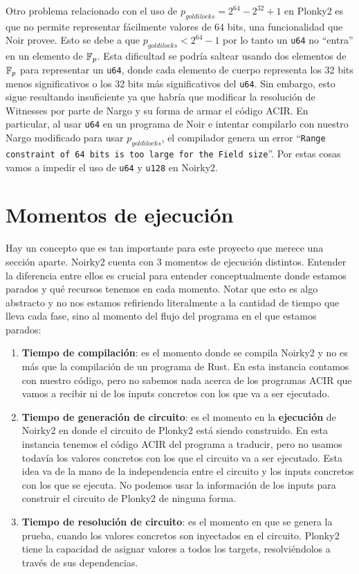 Otro problema relacionado con el uso de $p_{goldilocks} = 2^{64}-2^{32}+1$ en Plonky2 es que no permite representar fácilmente valores de 64 bits, una funcionalidad que Noir provee. Esto se debe a que $p_{goldilocks} < 2^{64}-1$ por lo tanto un \texttt{u64} no “entra'' en un elemento de $\mathbb{F}_p$. Esta dificultad se podría saltear usando dos elementos de $\mathbb{F}_p$ para representar un \texttt{u64}, donde cada elemento de cuerpo representa los 32 bits menos significativos o los 32 bits más significativos del \texttt{u64}. Sin embargo, esto sigue resultando insuficiente ya que habría que modificar la resolución de Witnesses por parte de Nargo y su forma de armar el código ACIR. En particular, al usar \texttt{u64} en un programa de Noir e intentar compilarlo con nuestro Nargo modificado para usar $p_{goldilocks}$, el compilador genera un error “\texttt{Range constraint of 64 bits is too large for the Field size}''. Por estas cosas vamos a impedir el uso de \texttt{u64} y \texttt{u128} en Noirky2. 



\section{Momentos de ejecución}\label{sec:tiempos_de_ejecución}
Hay un concepto que es tan importante para este proyecto que merece una sección aparte. Noirky2 cuenta con 3 momentos de ejecución distintos. Entender la diferencia entre ellos es crucial para entender conceptualmente donde estamos parados y qué recursos tenemos en cada momento. Notar que esto es algo abstracto y no nos estamos refiriendo literalmente a la cantidad de tiempo que lleva cada fase, sino al momento del flujo del programa en el que estamos parados:
\begin{enumerate}
    \item \textbf{Tiempo de compilación}: es el momento donde se compila Noirky2 y no es más que la compilación de un programa de Rust. En esta instancia contamos con nuestro código, pero no sabemos nada acerca de los programas ACIR que vamos a recibir ni de los inputs concretos con los que va a ser ejecutado.
    
    \item \textbf{Tiempo de generación de circuito}: es el momento en la \textbf{ejecución} de Noirky2 en donde el circuito de Plonky2 está siendo construido. En esta instancia tenemos el código ACIR del programa a traducir, pero no usamos todavía los valores concretos con los que el circuito va a ser ejecutado. Esta idea va de la mano de la independencia entre el circuito y los inputs concretos con los que se ejecuta. No podemos usar la información de los inputs para construir el circuito de Plonky2 de ninguna forma.

    \item \textbf{Tiempo de resolución de circuito}: es el momento en que se genera la prueba, cuando los valores concretos son inyectados en el circuito. Plonky2 tiene la capacidad de asignar valores a todos los targets, resolviéndolos a través de sus dependencias. 
\end{enumerate}

